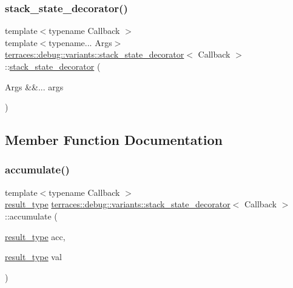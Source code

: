 \subsubsection{\texorpdfstring{stack\+\_\+state\+\_\+decorator()}{stack\_state\_decorator()}}
{\footnotesize\ttfamily template$<$typename Callback $>$ \\
template$<$typename... Args$>$ \\
\hyperlink{classterraces_1_1debug_1_1variants_1_1stack__state__decorator}{terraces\+::debug\+::variants\+::stack\+\_\+state\+\_\+decorator}$<$ Callback $>$\+::\hyperlink{classterraces_1_1debug_1_1variants_1_1stack__state__decorator}{stack\+\_\+state\+\_\+decorator} (\begin{DoxyParamCaption}\item[{Args \&\&...}]{args }\end{DoxyParamCaption})\hspace{0.3cm}{\ttfamily [inline]}}



\subsection{Member Function Documentation}
\mbox{\label{classterraces_1_1debug_1_1variants_1_1stack__state__decorator_a3ab51f3a9522d1ba4b068d00f5d74e0a}} 
\subsubsection{\texorpdfstring{accumulate()}{accumulate()}}
{\footnotesize\ttfamily template$<$typename Callback $>$ \\
\hyperlink{classterraces_1_1debug_1_1variants_1_1stack__state__decorator_a01062643b31a3124c3e77d409f112785}{result\+\_\+type} \hyperlink{classterraces_1_1debug_1_1variants_1_1stack__state__decorator}{terraces\+::debug\+::variants\+::stack\+\_\+state\+\_\+decorator}$<$ Callback $>$\+::accumulate (\begin{DoxyParamCaption}\item[{\hyperlink{classterraces_1_1debug_1_1variants_1_1stack__state__decorator_a01062643b31a3124c3e77d409f112785}{result\+\_\+type}}]{acc,  }\item[{\hyperlink{classterraces_1_1debug_1_1variants_1_1stack__state__decorator_a01062643b31a3124c3e77d409f112785}{result\+\_\+type}}]{val }\end{DoxyParamCaption})\hspace{0.3cm}{\ttfamily [inline]}}

